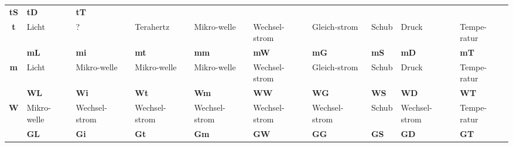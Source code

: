 \begin{landscape}
\begin{table}[hbt]
\begin{threeparttable}
\begin{tabularx}{\linewidth}{c|XXXXXXXXX}
			\cellcolor[HTML]{F8FF00}\textbf{tS} &
			\cellcolor[HTML]{FFCB2F}\textbf{tD} &
			\cellcolor[HTML]{FB0404}\textbf{tT} \\
			\multirow{-2}{*}{\textbf{t}} &
			\cellcolor[HTML]{32CB00}Licht &
			? &
			\cellcolor[HTML]{00D288}Terahertz &
			\cellcolor[HTML]{38FFF8}Mikro-welle &
			\cellcolor[HTML]{54C1F2}Wechsel-strom &
			\cellcolor[HTML]{4156EE}Gleich-strom &
			\cellcolor[HTML]{F8FF00}Schub &
			\cellcolor[HTML]{FFCB2F}Druck &
			\cellcolor[HTML]{FB0404}Tempe-ratur \\
			&
			\cellcolor[HTML]{32CB00}\textbf{mL} &
			\cellcolor[HTML]{38FFF8}\textbf{mi} &
			\cellcolor[HTML]{38FFF8}\textbf{mt} &
			\cellcolor[HTML]{38FFF8}\textbf{mm} &
			\cellcolor[HTML]{54C1F2}\textbf{mW} &
			\cellcolor[HTML]{4156EE}\textbf{mG} &
			\cellcolor[HTML]{F8FF00}\textbf{mS} &
			\cellcolor[HTML]{FFCB2F}\textbf{mD} &
			\cellcolor[HTML]{FB0404}\textbf{mT} \\
			\multirow{-2}{*}{\textbf{m}} &
			\cellcolor[HTML]{32CB00}Licht &
			\cellcolor[HTML]{38FFF8}Mikro-welle &
			\cellcolor[HTML]{38FFF8}Mikro-welle &
			\cellcolor[HTML]{38FFF8}Mikro-welle &
			\cellcolor[HTML]{54C1F2}Wechsel-strom &
			\cellcolor[HTML]{4156EE}Gleich-strom &
			\cellcolor[HTML]{F8FF00}Schub &
			\cellcolor[HTML]{FFCB2F}Druck &
			\cellcolor[HTML]{FB0404}Tempe-ratur \\
			&
			\cellcolor[HTML]{38FFF8}\textbf{WL} &
			\cellcolor[HTML]{54C1F2}\textbf{Wi} &
			\cellcolor[HTML]{54C1F2}\textbf{Wt} &
			\cellcolor[HTML]{54C1F2}\textbf{Wm} &
			\cellcolor[HTML]{54C1F2}\textbf{WW} &
			\cellcolor[HTML]{54C1F2}\textbf{WG} &
			\cellcolor[HTML]{F8FF00}\textbf{WS} &
			\cellcolor[HTML]{54C1F2}\textbf{WD} &
			\cellcolor[HTML]{FB0404}\textbf{WT} \\
			\multirow{-2}{*}{\textbf{W}} &
			\cellcolor[HTML]{38FFF8}Mikro-welle &
			\cellcolor[HTML]{54C1F2}Wechsel-strom &
			\cellcolor[HTML]{54C1F2}Wechsel-strom &
			\cellcolor[HTML]{54C1F2}Wechsel-strom &
			\cellcolor[HTML]{54C1F2}Wechsel-strom &
			\cellcolor[HTML]{54C1F2}Wechsel-strom &
			\cellcolor[HTML]{F8FF00}Schub &
			\cellcolor[HTML]{54C1F2}Wechsel-strom &
			\cellcolor[HTML]{FB0404}Tempe-ratur \\
			&
			\cellcolor[HTML]{32CB00}\textbf{GL} &
			\cellcolor[HTML]{4156EE}\textbf{Gi} &
			\cellcolor[HTML]{4156EE}\textbf{Gt} &
			\cellcolor[HTML]{4156EE}\textbf{Gm} &
			\cellcolor[HTML]{54C1F2}\textbf{GW} &
			\cellcolor[HTML]{4156EE}\textbf{GG} &
			\cellcolor[HTML]{F8FF00}\textbf{GS} &
			\cellcolor[HTML]{FFCB2F}\textbf{GD} &
			\cellcolor[HTML]{9B68F2}\textbf{GT} \\

\end{tabularx}
\end{threeparttable}
\end{table}
\end{landscape}
